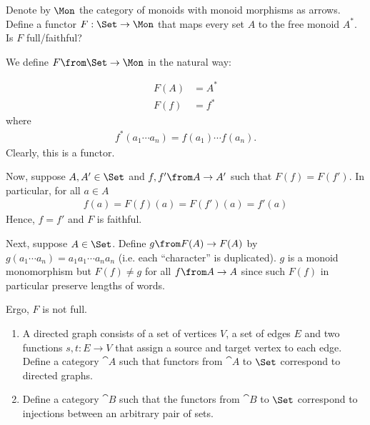 \begin{exercise}
  Denote by $\Mon$ the category of monoids with monoid morphisms as arrows.
  Define a functor $F : \Set \to \Mon$ that maps every set $A$ to the free monoid $A^*$.
  Is $F$ full/faithful?
\end{exercise}

\begin{answer}

We define $F\from\Set\to\Mon$ in the natural way:

\begin{align*}
  F(A)&=A^*\\
  F(f)&=f^*
\end{align*}
where
\begin{align*}
  f^*(a_1\cdots a_n)=f(a_1)\cdots f(a_n).
\end{align*}
Clearly, this is a functor. 

Now, suppose $A,A'\in\Set$ and $f,f'\from A\to A'$ such that $F(f)=F(f')$. In particular, for all $a\in A$
\begin{align*}
  f(a)=F(f)(a)=F(f')(a)=f'(a)
\end{align*}
Hence, $f=f'$ and $F$ is faithful.

Next, suppose $A\in\Set$. Define $g\from F(A)\to F(A)$ by $g(a_1\cdots a_n)=a_1a_1\cdots a_na_n$ (i.e. each ``character'' is duplicated). $g$ is a monoid monomorphism but $F(f)\neq g$ for all $f\from A\to A$ since such $F(f)$ in particular preserve lengths of words.

Ergo, $F$ is not full.
\end{answer}

\begin{exercise}
  \begin{enumerate}
    \item A directed graph consists of a set of vertices $V$, a set of edges $E$ and two functions $s, t : E \to V$ that assign a source and target vertex to each edge.
      Define a category $\cat{A}$ such that functors from $\cat{A}$ to $\Set$ correspond to directed graphs.
    \item Define a category $\cat{B}$ such that the functors from $\cat{B}$ to $\Set$ correspond to injections between an arbitrary pair of sets.
  \end{enumerate}
\end{exercise}

